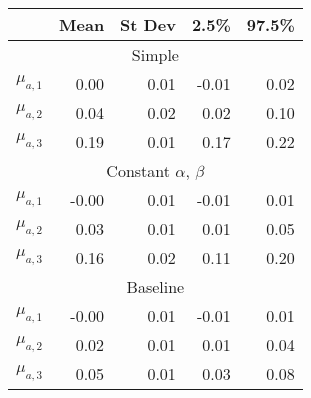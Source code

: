 \begin{tabular}{rrrrr} 
 \hline \hline 
& Mean & St Dev & \hspace{5pt} 2.5\% & 97.5\% \\ 
 \hline 
\multicolumn{5}{c}{Simple} \\ 
 \hline 
 $\mu_{a,1}$ & 0.00 & 0.01 & -0.01 & 0.02 \\ 
  $\mu_{a,2}$ & 0.04 & 0.02 & 0.02 & 0.10 \\ 
  $\mu_{a,3}$ & 0.19 & 0.01 & 0.17 & 0.22 \\ 
  [0.5em] 
 \hline 
\multicolumn{5}{c}{Constant $\alpha$, $\beta$} \\ 
 \hline 
 $\mu_{a,1}$ & -0.00 & 0.01 & -0.01 & 0.01 \\ 
  $\mu_{a,2}$ & 0.03 & 0.01 & 0.01 & 0.05 \\ 
  $\mu_{a,3}$ & 0.16 & 0.02 & 0.11 & 0.20 \\ 
  [0.5em] 
 \hline 
\multicolumn{5}{c}{Baseline} \\ 
 \hline 
 $\mu_{a,1}$ & -0.00 & 0.01 & -0.01 & 0.01 \\ 
  $\mu_{a,2}$ & 0.02 & 0.01 & 0.01 & 0.04 \\ 
  $\mu_{a,3}$ & 0.05 & 0.01 & 0.03 & 0.08 \\ 
  [0.5em] 
 \hline 
\end{tabular} 
